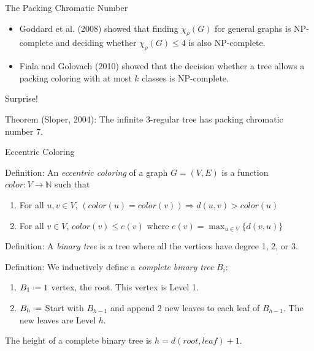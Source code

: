 \documentclass{beamer}
\newcommand*{\defeq}{\mathrel{\vcenter{\baselineskip0.5ex \lineskiplimit0pt
                     \hbox{\scriptsize.}\hbox{\scriptsize.}}}%
                     =}
\begin{document}
\begin{frame}{The Packing Chromatic Number}
\begin{itemize}
\item Goddard et al. (2008) showed that finding $\chi_{\rho}(G)$ for general graphs is NP-complete and deciding whether $\chi_{\rho}(G)\leq 4$ is also NP-complete.
\item Fiala and Golovach (2010) showed that the decision whether a tree allows a packing coloring with at most $k$ classes is NP-complete.
\end{itemize}
\end{frame}

\begin{frame}{Surprise!}
\begin{block}{Theorem (Sloper, 2004):}
The infinite 3-regular tree has packing chromatic number 7.
\end{block}
\end{frame}

\begin{frame}{Eccentric Coloring}
\begin{block}{Definition:}
An \emph{eccentric coloring} of a graph $G=(V,E)$ is a function $color:V\rightarrow\mathbb{N}$ such that
\begin{enumerate}
\item For all $u,v\in V$, $(color(u)=color(v))\Rightarrow d(u,v)>color(u)$
\item For all $v\in V$, $color(v)\leq e(v)$ where $e(v)=\max_{u\in V}\{d(v,u)\}$
\end{enumerate}
\end{block}
\end{frame}

\begin{frame}
\begin{block}{Definition:}
A \emph{binary tree} is a tree where all the vertices have degree 1, 2, or 3.
\end{block}
\pause
\begin{block}{Definition:}
We inductively define a \emph{complete binary tree} $B_i$:
\begin{enumerate}
\item $B_1\defeq 1$ vertex, the root.  This vertex is Level 1.
\item $B_h\defeq$ Start with $B_{h-1}$ and append 2 new leaves to each leaf of $B_{h-1}$.  The new leaves are Level $h$.
\end{enumerate}
The height of a complete binary tree is $h=d(root,leaf)+1$.
\end{block}
\end{frame}
\end{document}
